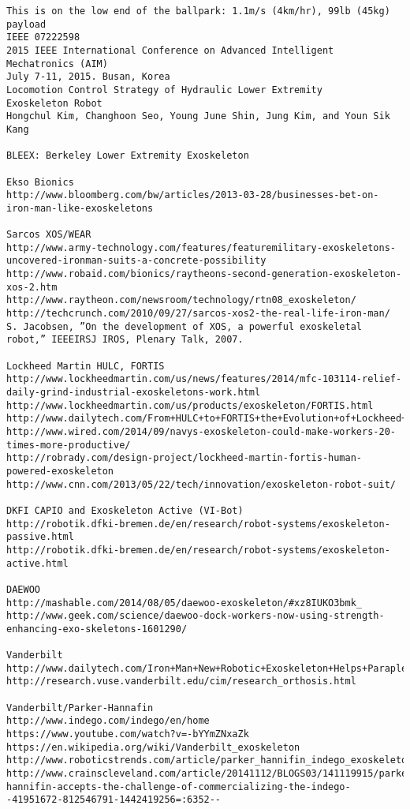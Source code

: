 \documentclass[letterpaper,12pt,fullpage]{article}
\begin{document}
\begin{verbatim}
This is on the low end of the ballpark: 1.1m/s (4km/hr), 99lb (45kg) payload
IEEE 07222598
2015 IEEE International Conference on Advanced Intelligent Mechatronics (AIM)
July 7-11, 2015. Busan, Korea
Locomotion Control Strategy of Hydraulic Lower Extremity
Exoskeleton Robot
Hongchul Kim, Changhoon Seo, Young June Shin, Jung Kim, and Youn Sik Kang

BLEEX: Berkeley Lower Extremity Exoskeleton

Ekso Bionics
http://www.bloomberg.com/bw/articles/2013-03-28/businesses-bet-on-iron-man-like-exoskeletons

Sarcos XOS/WEAR
http://www.army-technology.com/features/featuremilitary-exoskeletons-uncovered-ironman-suits-a-concrete-possibility
http://www.robaid.com/bionics/raytheons-second-generation-exoskeleton-xos-2.htm
http://www.raytheon.com/newsroom/technology/rtn08_exoskeleton/
http://techcrunch.com/2010/09/27/sarcos-xos2-the-real-life-iron-man/
S. Jacobsen, ”On the development of XOS, a powerful exoskeletal
robot,” IEEEIRSJ IROS, Plenary Talk, 2007.

Lockheed Martin HULC, FORTIS
http://www.lockheedmartin.com/us/news/features/2014/mfc-103114-relief-daily-grind-industrial-exoskeletons-work.html
http://www.lockheedmartin.com/us/products/exoskeleton/FORTIS.html
http://www.dailytech.com/From+HULC+to+FORTIS+the+Evolution+of+Lockheed+Martins+Incredible+Exosuit/article36421.htm
http://www.wired.com/2014/09/navys-exoskeleton-could-make-workers-20-times-more-productive/
http://robrady.com/design-project/lockheed-martin-fortis-human-powered-exoskeleton
http://www.cnn.com/2013/05/22/tech/innovation/exoskeleton-robot-suit/

DKFI CAPIO and Exoskeleton Active (VI-Bot)
http://robotik.dfki-bremen.de/en/research/robot-systems/exoskeleton-passive.html
http://robotik.dfki-bremen.de/en/research/robot-systems/exoskeleton-active.html

DAEWOO
http://mashable.com/2014/08/05/daewoo-exoskeleton/#xz8IUKO3bmk_
http://www.geek.com/science/daewoo-dock-workers-now-using-strength-enhancing-exo-skeletons-1601290/

Vanderbilt
http://www.dailytech.com/Iron+Man+New+Robotic+Exoskeleton+Helps+Paraplegics+Walk/article29079.htm
http://research.vuse.vanderbilt.edu/cim/research_orthosis.html

Vanderbilt/Parker-Hannafin
http://www.indego.com/indego/en/home
https://www.youtube.com/watch?v=-bYYmZNxaZk
https://en.wikipedia.org/wiki/Vanderbilt_exoskeleton
http://www.roboticstrends.com/article/parker_hannifin_indego_exoskeleton
http://www.crainscleveland.com/article/20141112/BLOGS03/141119915/parker-hannifin-accepts-the-challenge-of-commercializing-the-indego--41951672-812546791-1442419256=:6352--


\end{verbatim}
\end{document}
